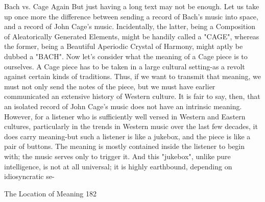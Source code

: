                                  Bach vs. Cage Again
But just having a long text may not be enough. Let us take up once more the difference
between sending a record of Bach's music into space, and a record of John Cage's music.
Incidentally, the latter, being a Composition of Aleatorically Generated Elements, might
be handily called a "CAGE", whereas the former, being a Beautiful Aperiodic Crystal of
Harmony, might aptly be dubbed a "BACH". Now let's consider what the meaning of a
Cage piece is to ourselves. A Cage piece has to be taken in a large cultural setting-as a
revolt against certain kinds of traditions. Thus, if we want to transmit that meaning, we
must not only send the notes of the piece, but we must have earlier communicated an
extensive history of Western culture. It is fair to say, then, that an isolated record of John
Cage's music does not have an intrinsic meaning. However, for a listener who is
sufficiently well versed in Western and Eastern cultures, particularly in the trends in
Western music over the last few decades, it does carry meaning-but such a listener is like
a jukebox, and the piece is like a pair of buttons. The meaning is mostly contained inside
the listener to begin with; the music serves only to trigger it. And this "jukebox", unlike
pure intelligence, is not at all universal; it is highly earthbound, depending on
idiosyncratic se-




The Location of Meaning                                                                   182

